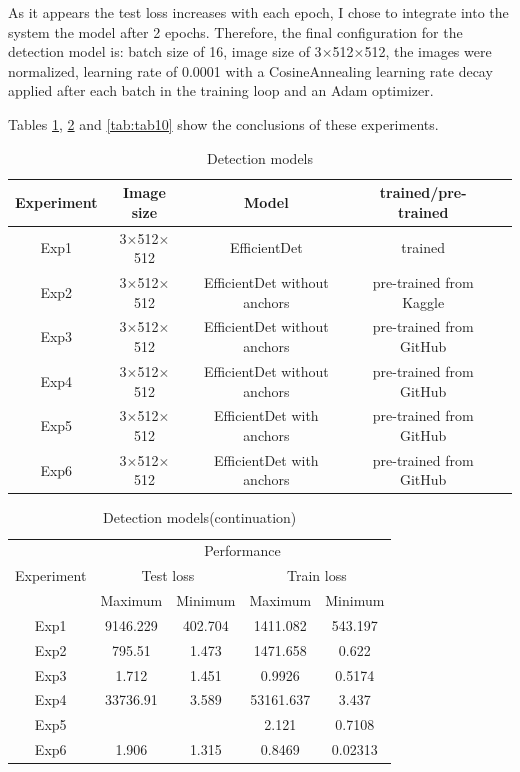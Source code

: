 As it appears the test loss increases with each epoch, I chose to integrate into the system the model after 2 epochs. Therefore, the final configuration for the detection model is: batch size of 16, image size of 3$\times$512$\times$512, the images were normalized, learning rate of 0.0001 with a CosineAnnealing learning rate decay applied after each batch in the training loop and an Adam optimizer.

Tables \ref{tab:tab8}, \ref{tab:tab9} and \ref{tab:tab10} show the conclusions of these experiments.

\begin{table}[!ht]
    \centering
    \begin{tabular}{|c|c|c|c|c|}
       \hline
       Experiment  & Image size & Model & trained/pre-trained\\
       \hline\hline
       Exp1 & 3$\times$512$\times$512 & EfficientDet & trained\\
       \hline
       Exp2 & 3$\times$512$\times$512 & EfficientDet without anchors & pre-trained from Kaggle\\
       \hline
       Exp3 & 3$\times$512$\times$512 & EfficientDet without anchors & pre-trained from GitHub \\
       \hline
       Exp4 & 3$\times$512$\times$512 & EfficientDet without anchors & pre-trained from GitHub \\
       \hline
       Exp5 & 3$\times$512$\times$512 & EfficientDet with anchors & pre-trained from GitHub \\
       \hline 
       Exp6 & 3$\times$512$\times$512 & EfficientDet with anchors & pre-trained from GitHub \\
       \hline
    \end{tabular}
    \caption{Detection models}
    \label{tab:tab8}
\end{table}

\begin{table}[H]
    \centering
    \begin{tabular}{|c|c|c|c|c|}
       \hline
       \multirow{3}{5em}{Experiment}  & \multicolumn{4}{c|}{Performance}
       \\ \cline{2-5}
        & \multicolumn{2}{c|}{Test loss} & \multicolumn{2}{c|}{Train loss}
        \\ \cline{2-5}
        & Maximum & Minimum & Maximum & Minimum \\
       \hline \hline
       Exp1 & 9146.229 & 402.704 & 1411.082 & 543.197 \\ \hline
       Exp2 & 795.51 & 1.473 & 1471.658 & 0.622 \\ \hline
       Exp3 & 1.712 & 1.451 & 0.9926 & 0.5174 \\ \hline
       Exp4 & 33736.91 & 3.589 & 53161.637 & 3.437\\ \hline
       Exp5 & & & 2.121 & 0.7108 \\ \hline
       Exp6 & 1.906 & 1.315 & 0.8469 & 0.02313\\ \hline

    \end{tabular}
    \caption{Detection models(continuation)}
    \label{tab:tab9}
\end{table}

